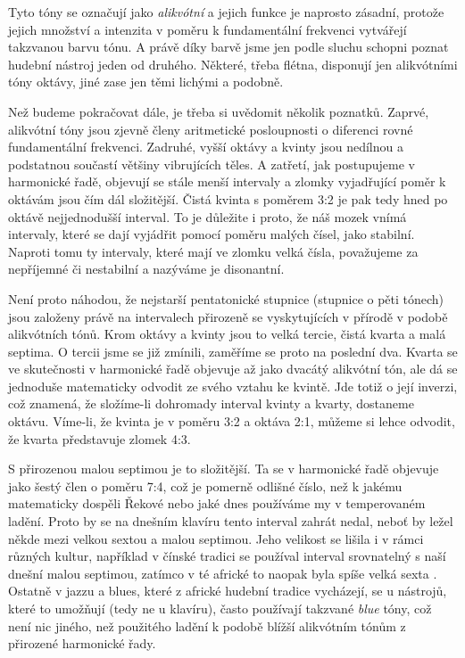 \documentclass[12pt]{article}
\begin{document}
Tyto tóny se označují jako \emph{alikvótní} a jejich funkce je naprosto zásadní, protože jejich množství a intenzita v poměru k fundamentální frekvenci vytvářejí takzvanou barvu tónu. A právě díky barvě jsme jen podle sluchu schopni poznat hudební nástroj jeden od druhého. Některé, třeba flétna, disponují jen alikvótními tóny oktávy, jiné zase jen těmi lichými a podobně.

Než budeme pokračovat dále, je třeba si uvědomit několik poznatků. Zaprvé, alikvótní tóny jsou zjevně členy aritmetické posloupnosti o diferenci rovné fundamentální frekvenci. Zadruhé, vyšší oktávy a kvinty jsou nedílnou a podstatnou součastí většiny vibrujících těles. A zatřetí, jak postupujeme v harmonické řadě, objevují se stále menší intervaly a zlomky vyjadřující poměr k oktávám jsou čím dál složitější. Čistá kvinta s poměrem 3:2 je pak tedy hned po oktávě nejjednodušší interval. To je důležite i proto, že náš mozek vnímá intervaly, které se dají vyjádřit pomocí poměru malých čísel, jako stabilní. Naproti tomu ty intervaly, které mají ve zlomku velká čísla, považujeme za nepříjemné či nestabilní a nazýváme je disonantní.

Není proto náhodou, že nejstarší pentatonické stupnice (stupnice o pěti tónech) jsou založeny právě na intervalech přirozeně se vyskytujících v přírodě v podobě alikvótních tónů. Krom oktávy a kvinty jsou to velká tercie, čistá kvarta a malá septima. O tercii jsme se již zmínili, zaměříme se proto na poslední dva. Kvarta se ve skutečnosti v harmonické řadě objevuje až jako dvacátý alikvótní tón, ale dá se jednoduše matematicky odvodit ze svého vztahu ke kvintě. Jde totiž o její inverzi, což znamená, že složíme-li dohromady interval kvinty a kvarty, dostaneme oktávu. Víme-li, že kvinta je v poměru 3:2 a oktáva 2:1, můžeme si lehce odvodit, že kvarta představuje zlomek 4:3.

S přirozenou malou septimou je to složitější. Ta se v harmonické řadě objevuje jako šestý člen o poměru 7:4, což je pomerně odlišné číslo, než k jakému matematicky dospěli Řekové nebo jaké dnes používáme my v temperovaném ladění. Proto by se na dnešním klavíru tento interval zahrát nedal, neboť by ležel někde mezi velkou sextou a malou septimou. Jeho velikost se lišila i v rámci různých kultur, například v čínské tradici se používal interval srovnatelný s naší dnešní malou septimou, zatímco v té africké to naopak byla spíše velká sexta \cite{bernstein}. Ostatně v jazzu a blues, které z africké hudební tradice vycházejí, se u nástrojů, které to umožňují (tedy ne u klavíru), často používají takzvané \emph{blue} tóny, což není nic jiného, než  použitého ladění k podobě blížší alikvótním tónům z přirozené harmonické řady.
\end{document}
